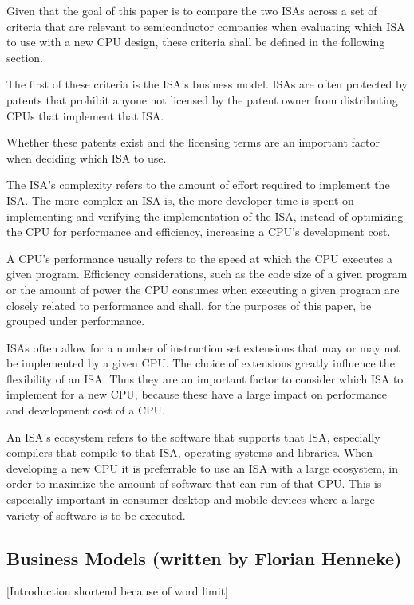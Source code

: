 \documentclass[conference]{IEEEtran}
\begin{document}
Given that the goal of this paper is to compare the two \glspl{ISA}
across a set of criteria that are relevant to semiconductor companies when evaluating which \gls{ISA} to use with a new CPU design,
these criteria shall be defined in the following section.

The first of these criteria is the \gls{ISA}'s business model. \glspl{ISA} are often protected by patents that prohibit anyone not licensed
by the patent owner from distributing \glspl{CPU} that implement that \gls{ISA}. \cite{Tang2011}

Whether these patents exist and the licensing terms
are an important factor when deciding which \gls{ISA} to use.

The \gls{ISA}'s complexity refers to the amount of effort required to implement the \gls{ISA}. The more complex an \gls{ISA} is, the more developer
time is spent on implementing and verifying the implementation of the \gls{ISA}, instead of optimizing the \gls{CPU} for performance and efficiency,
increasing a \gls{CPU}'s development cost. \cite{Patterson1980}

A \gls{CPU}'s performance usually refers to the speed at which the \gls{CPU} executes a given program. Efficiency considerations, such as the code size of a given program
or the amount of power the \gls{CPU} consumes when executing a given program are closely related to performance and shall, for the
purposes of this paper, be grouped under performance.


\glspl{ISA} often allow for a number of instruction set extensions that may or may not be implemented by a given \gls{CPU}.
The choice of extensions greatly influence the flexibility of an \gls{ISA}. Thus they are an important factor to consider which \gls{ISA} to implement for a new \gls{CPU}, because these have a large impact on performance
and development cost of a \gls{CPU}.

An \gls{ISA}'s ecosystem refers to the software that supports that \gls{ISA}, especially compilers that compile to that \gls{ISA}, operating systems and libraries.
When developing a new \gls{CPU} it is preferrable to use an \gls{ISA} with a large ecosystem, in order to maximize the amount of software
that can run of that \gls{CPU}. This is especially important in consumer desktop and mobile devices where a large variety of software is to be executed.

	\subsection{Business Models (written by Florian Henneke)}
	[Introduction shortend because of word limit]
\end{document}

